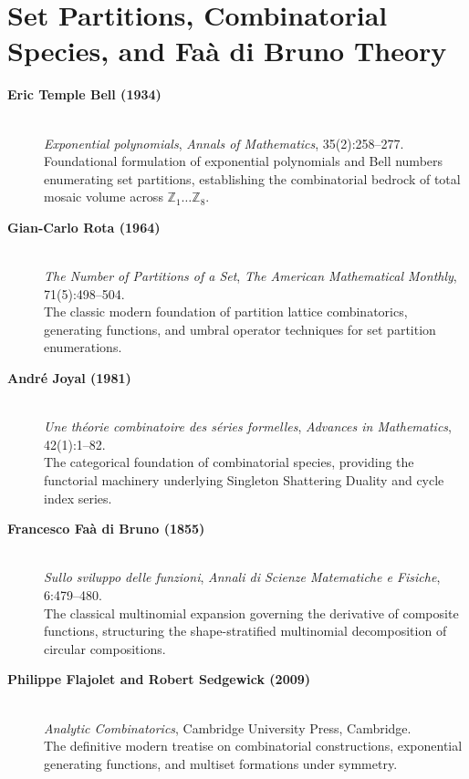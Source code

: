 \section*{Set Partitions, Combinatorial Species, and Fa\`a di Bruno Theory}

\begin{description}
    \item[\textbf{Eric Temple Bell (1934)}]\mbox{}\\
    \emph{Exponential polynomials}, \emph{Annals of Mathematics}, 35(2):258--277.\\
    Foundational formulation of exponential polynomials and Bell numbers enumerating set partitions, establishing the combinatorial bedrock of total mosaic volume across $\mathbb{Z}_1 \dots \mathbb{Z}_8$.

    \item[\textbf{Gian-Carlo Rota (1964)}]\mbox{}\\
    \emph{The Number of Partitions of a Set}, \emph{The American Mathematical Monthly}, 71(5):498--504.\\
    The classic modern foundation of partition lattice combinatorics, generating functions, and umbral operator techniques for set partition enumerations.

    \item[\textbf{Andr\'e Joyal (1981)}]\mbox{}\\
    \emph{Une th\'eorie combinatoire des s\'eries formelles}, \emph{Advances in Mathematics}, 42(1):1--82.\\
    The categorical foundation of combinatorial species, providing the functorial machinery underlying Singleton Shattering Duality and cycle index series.

    \item[\textbf{Francesco Fa\`a di Bruno (1855)}]\mbox{}\\
    \emph{Sullo sviluppo delle funzioni}, \emph{Annali di Scienze Matematiche e Fisiche}, 6:479--480.\\
    The classical multinomial expansion governing the derivative of composite functions, structuring the shape-stratified multinomial decomposition of circular compositions.

    \item[\textbf{Philippe Flajolet and Robert Sedgewick (2009)}]\mbox{}\\
    \emph{Analytic Combinatorics}, Cambridge University Press, Cambridge.\\
    The definitive modern treatise on combinatorial constructions, exponential generating functions, and multiset formations under symmetry.
\end{description}

